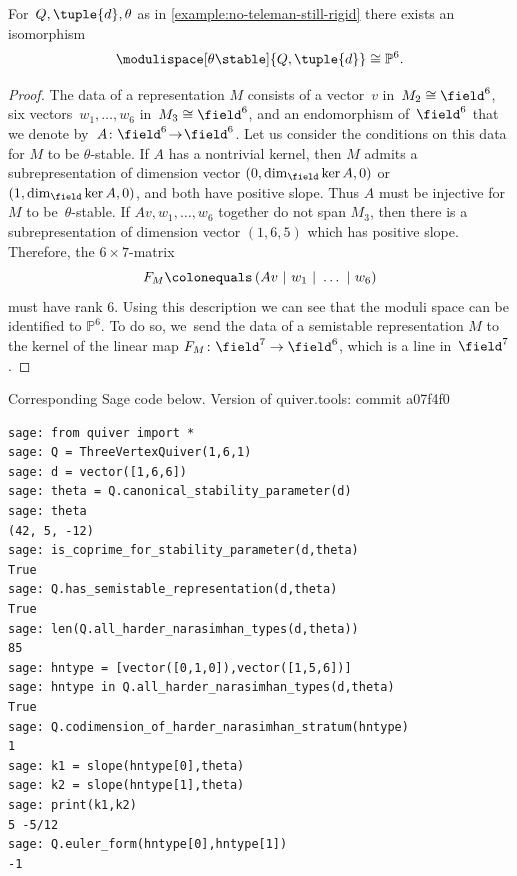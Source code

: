 \begin{lemma}
\label{lemma:P6}
For~$Q,\tuple{d},\theta$ as in \cref{example:no-teleman-still-rigid}
there exists an isomorphism
\begin{equation*}
\modulispace[\theta\stable]{Q,\tuple{d}}\cong\mathbb{P}^6.
\end{equation*}
\end{lemma}

\begin{proof}
The data of a representation $M$ consists of
a vector~$v$ in~$M_2\cong\field^6$,
six vectors~$w_1,\dots,w_6$ in~$M_3\cong\field^6$,
and an endomorphism of~$\field^6$ that we denote by~\hbox{$A \colon \field^6 \!\to\! \field^6$}.
Let us consider the conditions on this data for $M$ to be $\theta$-stable.
If $A$ has a nontrivial kernel, then $M$ admits a subrepresentation of dimension vector $(0,\dim_\field\ker A,0)$ or $(1,\dim_\field\ker A,0)$,
and both have positive slope.
Thus $A$ must be injective for~$M$ to be~$\theta$-stable.
If $Av,w_1,\dots,w_6$ together do not span $M_3$,
then there is a subrepresentation of dimension vector $(1,6,5)$ which has positive slope.
Therefore, the $6 \times 7$-matrix
\begin{equation*}
F_{M} \colonequals\left( Av~|~w_1~|~\dots~|~w_6 \right)
\end{equation*}
must have rank $6$.
Using this description we can see that
the moduli space can be identified to $\mathbb{P}^6$.
To do so, we~send the data of a semistable representation $M$ to
the kernel of the linear map $F_M \colon \field^7 \to \field^6$,
which is a line in~$\field^7$.
\end{proof}
\ifcode
Corresponding Sage code below. Version of quiver.tools: commit a07f4f0

\begin{verbatim}
sage: from quiver import *
sage: Q = ThreeVertexQuiver(1,6,1)
sage: d = vector([1,6,6])
sage: theta = Q.canonical_stability_parameter(d)
sage: theta
(42, 5, -12)
sage: is_coprime_for_stability_parameter(d,theta)
True
sage: Q.has_semistable_representation(d,theta)
True
sage: len(Q.all_harder_narasimhan_types(d,theta))
85
sage: hntype = [vector([0,1,0]),vector([1,5,6])]
sage: hntype in Q.all_harder_narasimhan_types(d,theta)
True
sage: Q.codimension_of_harder_narasimhan_stratum(hntype)
1
sage: k1 = slope(hntype[0],theta)
sage: k2 = slope(hntype[1],theta)
sage: print(k1,k2)
5 -5/12
sage: Q.euler_form(hntype[0],hntype[1])
-1
\end{verbatim}
\fi

